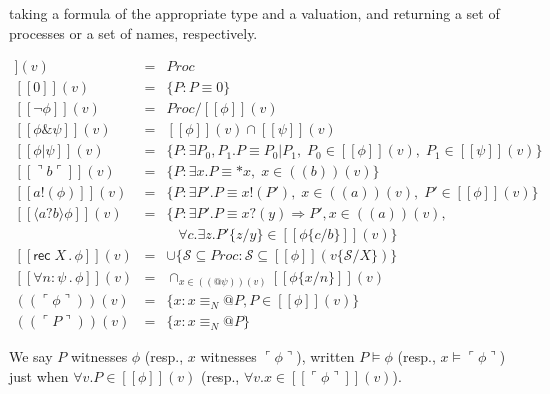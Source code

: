 \documentclass[]{amsart}
\makeatletter
\newcommand{\ldb}{[\![}
\newcommand{\rdb}{]\!]}
\newcommand{\ldrb}{(\!(}
\newcommand{\rdrb}{)\!)}
\newcommand{\lpquote}{\ulcorner}
\newcommand{\rpquote}{\urcorner}
\newcommand{\id}[1]{\texttt{#1}}
\newcommand{\pzero}{\mathbin{0}}
\newcommand{\juxtap}{\mathbin{\id{|}}}
\newcommand{\concat}{\Rightarrow}
\newcommand{\scong}{\mathbin{\equiv}}
\newcommand{\nameeq}{\mathbin{\equiv_N}}
\newcommand{\binpar}[2]{#1 \juxtap #2}
\newcommand{\prefix}[3]{#1 ? ( #2 ) \concat #3}
\newcommand{\lift}[2]{#1 ! ( #2 )}
\newcommand{\quotep}[1]{@#1}
\newcommand{\dropn}[1]{*#1}
\newcommand{\substn}[2]{\id{\{} #1 / #2 \id{\}}}
\newcommand{\meaningof}[1]{\ldb #1 \rdb}
\newcommand{\pmeaningof}[1]{\ldb #1 \rdb}
\newcommand{\nmeaningof}[1]{\ldrb #1 \rdrb}
\newcommand{\Proc}{\mathbin{Proc}}
\newcommand{\ptrue}{\mathbin{true}}
\newcommand{\pdropf}[1]{\rpquote #1 \lpquote}
\newcommand{\pquotep}[1]{\lpquote #1 \rpquote}
\newcommand{\plift}[2]{#1 ! ( #2 )}
\newcommand{\pprefix}[3]{\langle #1 ? #2 \rangle #3}
\newcommand{\pgfp}[2]{\textsf{rec} \; #1 \mathbin{.} #2}
\newcommand{\pquant}[3]{\forall #1 \mathbin{:} #2 \mathbin{.} #3}
\theoremstyle{definition}
\theoremstyle{remark}
\numberwithin{equation}{subsection}
\makeatother
\begin{document}
\noindent taking a formula of the appropriate type and a valuation, and
returning a set of processes or a set of names, respectively.

\begin{eqnarray}
  \pmeaningof{\ptrue}(v) & = & \Proc \nonumber \\ 
  \pmeaningof{\pzero}(v) & = & \{ P : P \scong \pzero \} \nonumber \\ 
  \pmeaningof{\neg \phi}(v) & = & \Proc / \pmeaningof{\phi}(v) \nonumber\\
  \pmeaningof{\phi \& \psi}(v) & = & \pmeaningof{\phi}(v) \cap \pmeaningof{\psi}(v) \nonumber\\
  \pmeaningof{\binpar{\phi}{\psi}}(v) & = &
  \{ P : \exists P_0, P_1.P \scong \binpar{P_0}{P_1}, \; P_0 \in \pmeaningof{\phi}(v), \;  P_1 \in \pmeaningof{\psi}(v) \} \nonumber\\
  \pmeaningof{\pdropf{b}}(v) & = & \{ P : \exists x.P \scong {\dropn{x}}, \; x \in \nmeaningof{b}(v) \} \nonumber\\	
  \pmeaningof{\plift{a}{\phi}}(v) & = & \{ P : \exists P'.P \scong {\lift{x}{P'}},
                                           \; x \in \nmeaningof{a}(v), 
                                           \; P' \in \pmeaningof{\phi}(v) \} \nonumber\\
  \pmeaningof{\pprefix{a}{b}{\phi}}(v) & = & \{ P : \exists P'.P \scong {\prefix{x}{y}{P'}}, x \in \nmeaningof{a}(v), \nonumber\\
                                   &   &            \; \; \; \forall c . \exists z . {P'}\substn{z}{y} \in \pmeaningof{{\phi}\substn{c}{b}}(v) \} \nonumber\\
  \pmeaningof{\pgfp{X}{\phi}}(v) & = & \cup \{ \mathcal{S} \subseteq \Proc : \mathcal{S} \subseteq \pmeaningof{\phi}(v\substn{\mathcal{S}}{X})\} \nonumber\\
  \pmeaningof{\pquant{n}{\psi}{\phi}}(v) & = & \cap_{x \in \nmeaningof{\quotep{\psi}}(v)} \pmeaningof{{\phi}\substn{x}{n}}(v) \nonumber\\
  \nmeaningof{\pquotep{\phi}}(v) & = & \{ x : x \nameeq \quotep{P}, P \in \pmeaningof{\phi}(v) \} \nonumber\\
  \nmeaningof{\pquotep{P}}(v) & = & \{ x : x \nameeq  \quotep{P} \} \nonumber
\end{eqnarray}

We say $P$ witnesses $\phi$ (resp., $x$ witnesses $\pquotep{\phi}$),
written $P \models \phi$ (resp., $x \models \pquotep{\phi}$) just when
$\forall v . P \in \meaningof{\phi}(v)$ (resp., $\forall v . x \in \meaningof{\pquotep{\phi}}(v)$).
\end{document}
